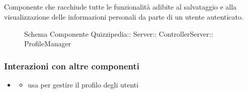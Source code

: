 \subsection{}
Componente che racchiude tutte le funzionalità adibite al salvataggio e alla visualizzazione delle informazioni personali da parte di un utente autenticato.
\begin{figure}[H]
\centering
\noindent{}
\caption[Schema Componente ProfileManager]{Schema Componente Quizzipedia:: Server:: ControllerServer:: ProfileManager}
\end{figure}
\subsubsection{Interazioni con altre componenti}
\begin{itemize}
\item {}
\begin{itemize}
\item usa  per gestire il profilo degli utenti
\end{itemize}
\end{itemize}
